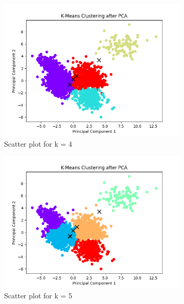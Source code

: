 \documentclass[12pt]{report}
\begin{document}
	\begin{figure}[H]
		\centering
		\begin{subfigure}{.5\textwidth}
			\centering
			\includegraphics[width=.9\linewidth]{../K-means/Output/Dataset2/scatterPlot_k=4.png}
			\caption{Scatter plot for k = 4}
			\label{Dataset2Scatterplotk4}
		\end{subfigure}%
		\begin{subfigure}{.5\textwidth}
			\centering
			\includegraphics[width=.9\linewidth]{../K-means/Output/Dataset2/scatterPlot_k=5.png}
			\caption{Scatter plot for k = 5}
			\label{Dataset2Scatterplotk5}
		\end{subfigure}
		\begin{subfigure}{.5\textwidth}%
			\centering

\end{subfigure}
\end{figure}
\end{document}
